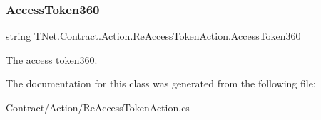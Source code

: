 \subsubsection{\texorpdfstring{Access\+Token360}{AccessToken360}}
{\footnotesize\ttfamily string T\+Net.\+Contract.\+Action.\+Re\+Access\+Token\+Action.\+Access\+Token360\hspace{0.3cm}{\ttfamily [protected]}}



The access token360. 



The documentation for this class was generated from the following file\+:\begin{DoxyCompactItemize}
\item 
Contract/\+Action/Re\+Access\+Token\+Action.\+cs\end{DoxyCompactItemize}
